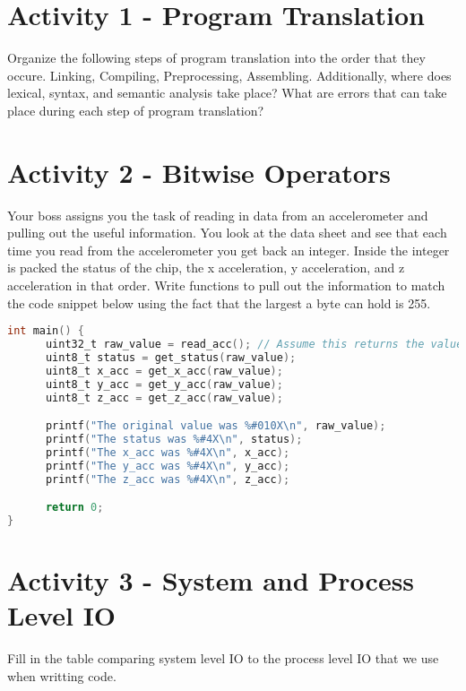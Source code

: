 \documentclass[]{article}
\begin{document}
\section*{Activity 1 - Program Translation}
Organize the following steps of program translation into the order that they occure. Linking,
Compiling, Preprocessing, Assembling. Additionally, where does lexical, syntax, and semantic
analysis take place? What are errors that can take place during each step of program translation?

\section*{Activity 2 - Bitwise Operators}
Your boss assigns you the task of reading in data from an accelerometer and pulling out the useful
information. You look at the data sheet and see that each time you read from the accelerometer you
get back an integer. Inside the integer is packed the status of the chip, the x acceleration, y
acceleration, and z acceleration in that order. Write functions to pull out the information to 
match the code snippet below using the fact that the largest a byte can hold is 255.
\begin{lstlisting}[language=C]
int main() {
      uint32_t raw_value = read_acc(); // Assume this returns the value from the accelerometer
      uint8_t status = get_status(raw_value);
      uint8_t x_acc = get_x_acc(raw_value);
      uint8_t y_acc = get_y_acc(raw_value);
      uint8_t z_acc = get_z_acc(raw_value);

      printf("The original value was %#010X\n", raw_value);
      printf("The status was %#4X\n", status);
      printf("The x_acc was %#4X\n", x_acc);
      printf("The y_acc was %#4X\n", y_acc);
      printf("The z_acc was %#4X\n", z_acc);

      return 0;
}
\end{lstlisting}

\section*{Activity 3 - System and Process Level IO}
Fill in the table comparing system level IO to the process level IO that we use when writting code.
\end{document}
